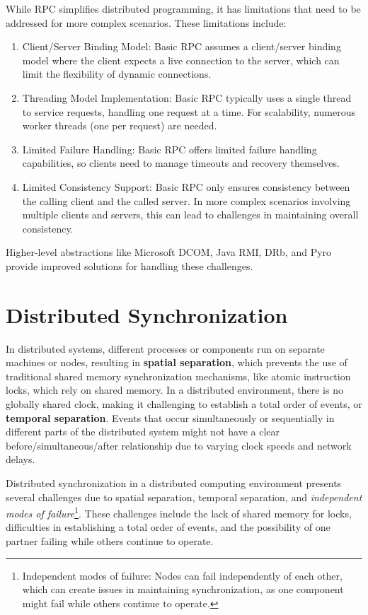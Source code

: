 \documentclass{report}
\newcommand{\definitionBegin}[1]{\begin{tcolorbox}[title={Definition: #1}]}
\newcommand{\definitionEnd}{\end{tcolorbox}}
\newcommand{\corollaryBegin}[1]{\begin{tcolorbox}[colback=teal!5!white,colframe=black!75!teal,title={Corollary:
      #1}]}
\newcommand{\corollaryEnd}{\end{tcolorbox}}
\begin{document}
\corollaryBegin{Issues}
While RPC simplifies distributed programming, it has limitations that need to be addressed for more
complex scenarios. These limitations include: 

\begin{enumerate}[label=\textit{(\roman*)}]
\item Client/Server Binding Model: Basic RPC assumes a client/server binding model where the
  client expects a live connection to the server, which can limit the flexibility of dynamic
  connections.
\item Threading Model Implementation: Basic RPC typically uses a single thread to service
  requests, handling one request at a time. For scalability, numerous worker threads (one per request)
  are needed.
\item Limited Failure Handling: Basic RPC offers limited failure handling capabilities, so clients
  need to manage timeouts and recovery themselves.
\item Limited Consistency Support: Basic RPC only ensures consistency between the calling client
  and the called server. In more complex scenarios involving multiple clients and servers, this can
  lead to challenges in maintaining overall consistency.
\end{enumerate}
Higher-level abstractions like Microsoft DCOM, Java RMI, DRb, and Pyro provide improved solutions
for handling these challenges.
\corollaryEnd





\section{Distributed Synchronization}
\definitionBegin{Spatial and Temporal Separation}
In distributed systems, different processes or components run on separate machines or nodes,
resulting in \textbf{spatial separation}, which prevents the use of traditional shared
memory synchronization mechanisms, like atomic instruction locks, which rely on shared memory.
\tcblower
In a distributed environment, there is no globally shared clock, making it challenging to establish
a total order of events, or \textbf{temporal separation}. Events that occur simultaneously or
sequentially in different parts of the distributed system might not have a clear
before/simultaneous/after relationship due to varying clock speeds and network delays.
\definitionEnd

Distributed synchronization in a distributed computing environment presents several challenges due
to spatial separation, temporal separation, and \textit{independent modes of
failure}\footnote{Independent modes of failure: Nodes can fail independently of each other, which
can create issues in maintaining synchronization, as one component might fail while others continue
to operate.}. These challenges include the lack of shared memory for locks, difficulties in
establishing a total order of events, and the possibility of one partner failing while others
continue to operate.
\end{document}
